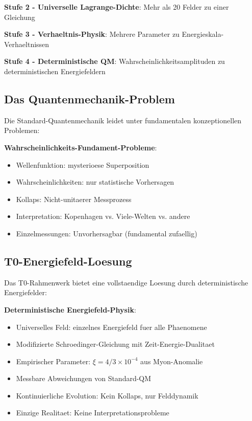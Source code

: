 \documentclass[12pt,a4paper]{article}
\newcommand{\xipar}{\xi}
\begin{document}
	\textbf{Stufe 2 - Universelle Lagrange-Dichte}: Mehr als 20 Felder zu einer Gleichung
	
	\textbf{Stufe 3 - Verhaeltnis-Physik}: Mehrere Parameter zu Energieskala-Verhaeltnissen
	
	\textbf{Stufe 4 - Deterministische QM}: Wahrscheinlichkeitsamplituden zu deterministischen Energiefeldern
	
	\subsection{Das Quantenmechanik-Problem}
	
	Die Standard-Quantenmechanik leidet unter fundamentalen konzeptionellen Problemen:
	
	\begin{tcolorbox}[colback=red!5!white,colframe=red!75!black,title=Standard-QM-Probleme]
		\textbf{Wahrscheinlichkeits-Fundament-Probleme}:
		\begin{itemize}
			\item Wellenfunktion: mysterioese Superposition
			\item Wahrscheinlichkeiten: nur statistische Vorhersagen
			\item Kollaps: Nicht-unitaerer Messprozess
			\item Interpretation: Kopenhagen vs. Viele-Welten vs. andere
			\item Einzelmessungen: Unvorhersagbar (fundamental zufaellig)
		\end{itemize}
	\end{tcolorbox}
	
	\subsection{T0-Energiefeld-Loesung}
	
	Das T0-Rahmenwerk bietet eine vollstaendige Loesung durch deterministische Energiefelder:
	
	\begin{tcolorbox}[colback=blue!5!white,colframe=blue!75!black,title=T0-Deterministisches Fundament]
		\textbf{Deterministische Energiefeld-Physik}:
		\begin{itemize}
			\item Universelles Feld: einzelnes Energiefeld fuer alle Phaenomene
			\item Modifizierte Schroedinger-Gleichung mit Zeit-Energie-Dualitaet
			\item Empirischer Parameter: $\xipar = 4/3 \times 10^{-4}$ aus Myon-Anomalie
			\item Messbare Abweichungen von Standard-QM
			\item Kontinuierliche Evolution: Kein Kollaps, nur Felddynamik
			\item Einzige Realitaet: Keine Interpretationsprobleme
		\end{itemize}
	\end{tcolorbox}
	
\end{document}
